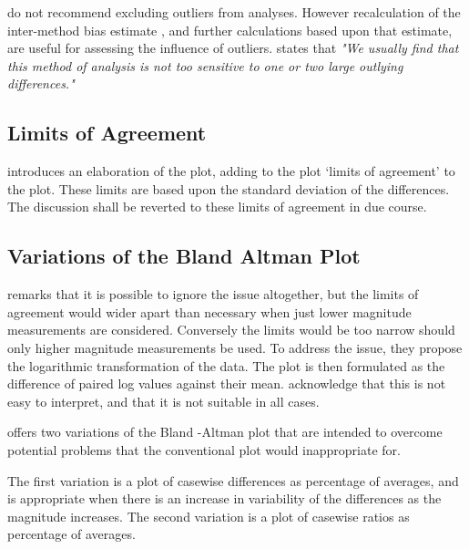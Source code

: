 \documentclass[12pt, a4paper]{report}
\theoremstyle{plain}
\theoremstyle{definition}
\theoremstyle{remark}
\begin{document}
	\citet*{BA99} do not recommend excluding outliers from analyses.
	However recalculation of the inter-method bias estimate , and
	further calculations based upon that estimate, are useful for
	assessing the influence of outliers.\citep{BA99} states that
	\emph{"We usually find that this method of analysis is not too
		sensitive to one or two large outlying differences."}
	
	\subsection{Limits of Agreement}
	\citet{BA86} introduces an elaboration of the plot, adding to the
	plot `limits of agreement' to the plot. These limits are based
	upon the standard deviation of the differences. The discussion
	shall be reverted to these limits of agreement in due course.
	
	\subsection{Variations of the Bland Altman Plot}
	\citet{BA99} remarks that it is possible to ignore the issue
	altogether, but the limits of agreement would wider apart than
	necessary when just lower magnitude measurements are considered.
	Conversely the limits would be too narrow should only higher
	magnitude measurements be used. To address the issue, they propose
	the logarithmic transformation of the data. The plot is then
	formulated as the difference of paired log values against their
	mean. \citet{BA99} acknowledge that this is not easy to interpret,
	and that it is not suitable in all cases.
	
	\citet{BA99} offers two variations of the Bland -Altman plot that
	are intended to overcome potential problems that the conventional
	plot would inappropriate for.
	
	The first variation is a plot of casewise differences as
	percentage of averages, and is appropriate when there is an
	increase in variability of the differences as the magnitude
	increases. The second variation is a plot of casewise ratios as
	percentage of averages.
	
	
	
	
	
	
	
\end{document}

